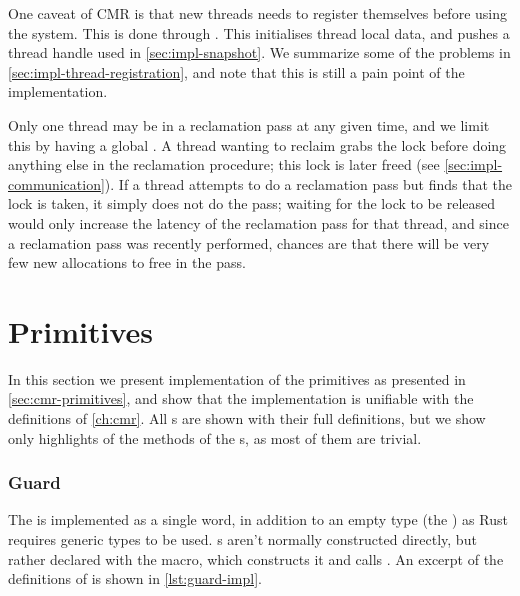 One caveat of CMR is that new threads needs to register themselves before using the system. This is
done through . This initialises thread local data, and pushes a thread
handle used in \cref{sec:impl-snapshot}. We summarize some of the problems in
\cref{sec:impl-thread-registration}, and note that this is still a pain point of the
implementation.

Only one thread may be in a reclamation pass at any given time, and we limit this by having a
global . A thread wanting to reclaim grabs the lock before doing anything else
in the reclamation procedure; this lock is later freed (see
\cref{sec:impl-communication}). If a thread attempts to do a reclamation pass but finds that the
lock is taken, it simply does not do the pass; waiting for the lock to be released would only
increase the latency of the reclamation pass for that thread, and since a reclamation pass was
recently performed, chances are that there will be very few new allocations to free in the pass.



\section{Primitives\label{sec:impl-primitives}}

In this section we present implementation of the primitives as presented in
\cref{sec:cmr-primitives}, and show that the implementation is unifiable with the definitions of
\cref{ch:cmr}. All s are shown with their full definitions, but we show only
highlights of the methods of the s, as most of them are trivial.

\subsubsection{Guard}

The  is implemented as a single word, in addition to an empty type (the
) as Rust requires generic types to be used. s aren't normally
constructed directly, but rather declared with the  macro, which constructs it and
calls .  An excerpt of the definitions of  is shown in
\cref{lst:guard-impl}.

\begin{figure}

\end{figure}

